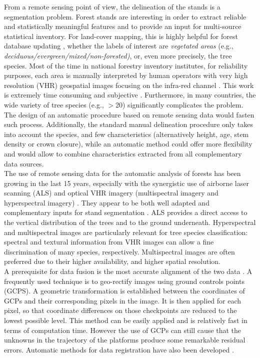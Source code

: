 From a remote sensing point of view, the delineation of the stands is a segmentation problem. Forest stands are interesting in order to extract reliable and statistically meaningful features and to provide an input for multi-source statistical inventory. For land-cover mapping, this is highly helpful for forest database updating \citep{Kim09}, whether the labels of interest are \textit{vegetated areas} {(e.g., \textit{deciduous/evergreen/mixed/non-forested)}}, or, even more precisely, the tree species. Most of the time in national forestry inventory institutes, for reliability purposes, each area is manually interpreted by human operators with very high resolution (VHR) geospatial images focusing on the infra-red channel \citep{Malatamo}. This work is extremely time consuming and subjective \citep{Wulder2008}. Furthermore, in many countries, the wide variety of tree species (e.g., $>$20) significantly complicates the problem. The design of an automatic procedure based on remote sensing data would fasten such process. Additionally, the standard manual delineation procedure only takes into account the species, and few characteristics (alternatively height, age, stem density or crown closure), while an automatic method could offer more flexibility and would allow to combine characteristics extracted from all complementary data sources. \\

The use of remote sensing data for the automatic analysis of forests has been growing in the last 15 years, especially with the synergistic use of airborne laser scanning (ALS) and optical VHR imagery (multispectral imagery and hyperspectral imagery) \citep{torabzadeh2014fusion,White2016CJRS}. They appear to be both well adapted and complementary inputs for stand segmentation \citep{dalponte2012tree,dalponte2015delineation,7500049}. ALS provides a direct access to the vertical distribution of the trees and to the ground underneath. Hyperspectral and multispectral images are particularly relevant for tree species classification: spectral and textural information from VHR  images can allow a fine discrimination of many species, respectively. Multispectral images are often preferred due to their higher availability, and higher spatial resolution. \\

A prerequisite for data fusion is the most accurate alignment of the two data \citep{torabzadeh2014fusion}. A frequently used technique is to geo-rectify images using ground controls points (GCPS). A geometric transformation is established between the coordinates of GCPs and their corresponding pixels in the image. It is then applied for each pixel, so that coordinate differences on those checkpoints are reduced to the lowest possible level. This method can be easily applied and is relatively fast in terms of computation time. However the use of GCPs can still cause that the unknowns in the trajectory of the platforms produce some remarkable residual errors. Automatic methods for data registration have also been developed \citep{habib2005photogrammetric,mastin2009automatic}. \\

